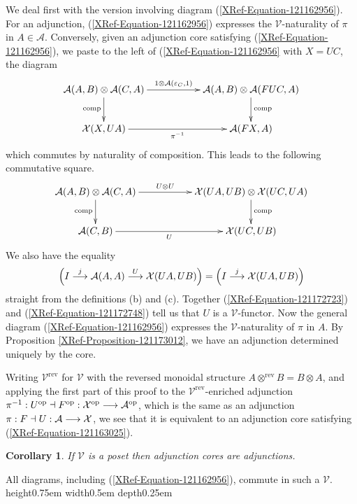 \documentclass[a4paper,10pt]{article}
\newcommand{\qed}{\nobreak \ifvmode \relax \else
      \ifdim\lastskip<1.5em \hskip-\lastskip
      \hskip1.5em plus0em minus0.5em \fi \nobreak
      \vrule height0.75em width0.5em depth0.25em\fi}
\newtheorem{corollary}[theorem]{Corollary}
\newenvironment{proof}[1][Proof]{\begin{trivlist}
\item[\hskip \labelsep {\bfseries #1}]}{\end{trivlist}}
\newcommand{\ba}{{\cal{A}}}
\newcommand{\bx}{{\cal{X}}}
\newcommand{\ev}{\mathcal{V} }
\numberwithin{equation}{section}
\begin{document}
\begin{proof} 
We deal first with the version involving diagram
(\ref{XRef-Equation-121162956}). For an adjunction, (\ref{XRef-Equation-121162956})
expresses the $\ev$-naturality of $\pi $ in $A\in \mathcal{A}$.
Conversely, given an adjunction core satisfying (\ref{XRef-Equation-121162956}),
we paste to the left of (\ref{XRef-Equation-121162956} with $X =UC$, the diagram 
\begin{equation}
\xymatrix{
\ba (A,B) \otimes \ba (C,A) \ar[rr]^-{1 \otimes \ba (\varepsilon _C ,1) } \ar[d]_-{\mathrm{comp}} && \ba (A,B) \otimes \ba (FUC,A) \ar[d]^-{\mathrm{comp}} \\
\bx (X,UA)  \ar[rr]_-{\pi^{-1} } && \ba (FX,A) }
\end{equation}
which commutes by naturality of composition. This leads to the following commutative square.
\begin{equation}\label{XRef-Equation-121172723}
\xymatrix{
\ba (A,B) \otimes \ba (C,A)  \ar[rr]^-{U \otimes U} \ar[d]_-{\mathrm{comp}} && \bx (UA,UB) \otimes \bx (UC,UA)  \ar[d]^-{\mathrm{comp}} \\
\ba (C,B)  \ar[rr]_-{U} && \bx (UC,UB) }
\end{equation}
We also have the equality
\begin{equation}
\left( I\overset{j}{\longrightarrow }\mathcal{A}( A,A) \overset{U}{\longrightarrow
}\bx( U A,U B) \right) =\left( I\overset{j}{\longrightarrow
}\bx( U A,U B) \right) %
\label{XRef-Equation-121172748}
\end{equation}
straight from the definitions (b) and (c). Together (\ref{XRef-Equation-121172723})
and (\ref{XRef-Equation-121172748}) tell us that $U$ is a $\ev$-functor.
Now the general diagram (\ref{XRef-Equation-121162956}) expresses
the $\ev$-naturality of $\pi $ in $A$. By Proposition \ref{XRef-Proposition-121173012},
we have an adjunction determined uniquely by the core.

Writing $\ev^{\mathrm{rev}}$ for $\ev$ with the
reversed monoidal structure $A\otimes ^{\mathrm{rev}}B=B\otimes
A$, and applying the first part of this proof to the $\ev^{\mathrm{rev}}$-enriched
adjunction $\pi ^{-1}:U^{\mathrm{op}}\dashv F^{\mathrm{op}}:\bx^{\mathrm{op}}\longrightarrow
\mathcal{A}^{\mathrm{op}}$, which is the same as an adjunction $\pi
:F\dashv U:\mathcal{A}\longrightarrow \bx$, we see that
it is equivalent to an adjunction core satisfying (\ref{XRef-Equation-121163025}).
\end{proof}

\begin{corollary}
If $\ev$ is a poset then adjunction cores are adjunctions.
\end{corollary}
\begin{proof}
All diagrams, including (\ref{XRef-Equation-121162956}),
commute in such a $\ev$.\qed
\end{proof}
\end{document}
